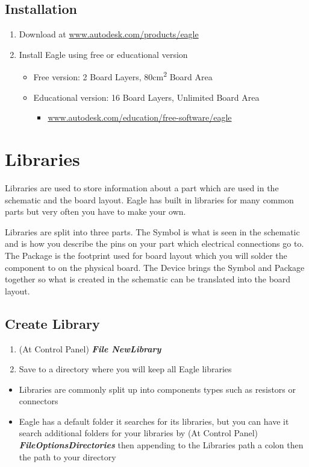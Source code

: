 \documentclass{article}
\begin{document}
\subsection{Installation}
\begin{enumerate}
    \item Download at \url{www.autodesk.com/products/eagle}
    \item Install Eagle using free or educational version
    \begin{itemize}
        \item Free version: 2 Board Layers, 80cm\textsuperscript{2} Board Area
        \item Educational version: 16 Board Layers, Unlimited Board Area
        \begin{itemize}
            \item \url{www.autodesk.com/education/free-software/eagle}
        \end{itemize}
    \end{itemize}
\end{enumerate}

\section{Libraries}
Libraries are used to store information about a part which are used in the schematic and the board layout. Eagle has built in libraries for many common parts but very often you have to make your own. \par
Libraries are split into three parts. The Symbol is what is seen in the schematic and is how you describe the pins on your part which electrical connections go to. The Package is the footprint used for board layout which you will solder the component to on the physical board. The Device brings the Symbol and Package together so what is created in the schematic can be translated into the board layout.

\subsection{Create Library} \label{create library}
\begin{enumerate}
    \item (At Control Panel) \textit{\textbf{File\textrightarrow
    New\textrightarrow Library}}
    \item Save to a directory where you will keep all Eagle libraries
\end{enumerate}
\begin{tcolorbox} [title=Tips \& Tricks]
    \begin{itemize}
        \item Libraries are commonly split up into components types such as resistors or connectors
        \item Eagle has a default folder it searches for its libraries, but you can have it search additional folders for your libraries by (At Control Panel) \textit{\textbf{File\textrightarrow Options\textrightarrow Directories}} then appending to the Libraries path a colon then the path to your directory
    \end{itemize}
\end{tcolorbox}
\end{document}
